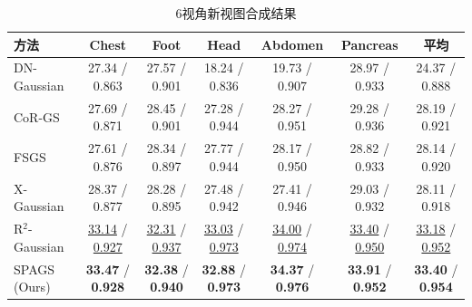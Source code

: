 \begin{table}[htbp]
    \centering
    \caption{6视角新视图合成结果}
    \label{tab:spags_6view}
    \footnotesize
    \begin{tabular*}{\textwidth}{@{\extracolsep{\fill}}lcccccc@{}}
        \toprule
        方法 & Chest & Foot & Head & Abdomen & Pancreas & 平均 \\
        \midrule
        DN-Gaussian & 27.34 / 0.863 & 27.57 / 0.901 & 18.24 / 0.836 & 19.73 / 0.907 & 28.97 / 0.933 & 24.37 / 0.888 \\
        CoR-GS & 27.69 / 0.871 & 28.45 / 0.901 & 27.28 / 0.944 & 28.27 / 0.951 & 29.28 / 0.936 & 28.19 / 0.921 \\
        FSGS & 27.61 / 0.876 & 28.34 / 0.897 & 27.77 / 0.944 & 28.17 / 0.950 & 28.82 / 0.933 & 28.14 / 0.920 \\
        X-Gaussian & 28.37 / 0.877 & 28.28 / 0.895 & 27.48 / 0.942 & 27.41 / 0.946 & 29.03 / 0.932 & 28.11 / 0.918 \\
        R$^2$-Gaussian & \underline{33.14} / \underline{0.927} & \underline{32.31} / \underline{0.937} & \underline{33.03} / \underline{0.973} & \underline{34.00} / \underline{0.974} & \underline{33.40} / \underline{0.950} & \underline{33.18} / \underline{0.952} \\
        SPAGS (Ours) & \textbf{33.47} / \textbf{0.928} & \textbf{32.38} / \textbf{0.940} & \textbf{32.88} / \textbf{0.973} & \textbf{34.37} / \textbf{0.976} & \textbf{33.91} / \textbf{0.952} & \textbf{33.40} / \textbf{0.954} \\
        \bottomrule
    \end{tabular*}
\end{table}

